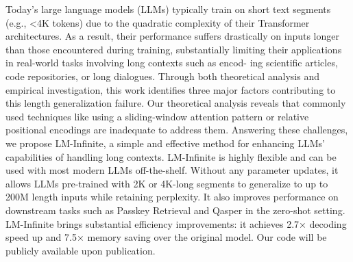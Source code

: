 Today’s large language models (LLMs) typically train on short text segments (e.g., \textless{}4K tokens) due to the quadratic complexity of their Transformer architectures. As a result, their performance suffers drastically on inputs longer than those encountered during training, substantially limiting their applications in real-world tasks involving long contexts such as encod- ing scientific articles, code repositories, or long dialogues. Through both theoretical analysis and empirical investigation, this work identifies three major factors contributing to this length generalization failure. Our theoretical analysis reveals that commonly used techniques like using a sliding-window attention pattern or relative positional encodings are inadequate to address them. Answering these challenges, we propose LM-Infinite, a simple and effective method for enhancing LLMs’ capabilities of handling long contexts. LM-Infinite is highly flexible and can be used with most modern LLMs off-the-shelf. Without any parameter updates, it allows LLMs pre-trained with 2K or 4K-long segments to generalize to up to 200M length inputs while retaining perplexity. It also improves performance on downstream tasks such as Passkey Retrieval and Qasper in the zero-shot setting. LM-Infinite brings substantial efficiency improvements: it achieves 2.7× decoding speed up and 7.5× memory saving over the original model. Our code will be publicly available upon publication.